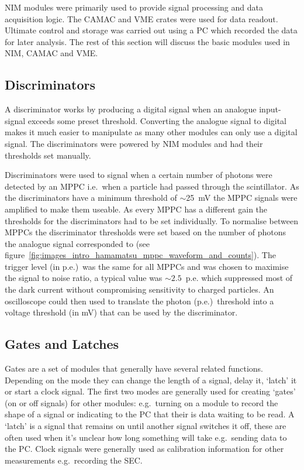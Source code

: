 NIM modules were primarily used to provide signal processing and data acquisition logic. The CAMAC and VME crates were used for data readout. Ultimate control and storage was carried out using a PC which recorded the data for later analysis. The rest of this section will discuss the basic modules used in NIM, CAMAC and VME.
\subsection{Discriminators} %
\label{ssub:discriminators}
A discriminator works by producing a digital signal when an analogue input-signal exceeds some preset threshold. Converting the analogue signal to digital makes it much easier to manipulate as many other modules can only use a digital signal. The discriminators were powered by NIM modules and had their thresholds set manually.

Discriminators were used to signal when a certain number of photons were detected by an MPPC i.e.\ when a particle had passed through the scintillator. As the discriminators have a minimum threshold of \(\sim\)25~mV the MPPC signals were amplified to make them useable. As every MPPC has a different gain the thresholds for the discriminators had to be set individually. To normalise between MPPCs the discriminator thresholds were set based on the number of photons the analogue signal corresponded to (see figure~\ref{fig:images_intro_hamamatsu_mppc_waveform_and_counts}). The trigger level (in p.e.)\ was the same for all MPPCs and was chosen to maximise the signal to noise ratio, a typical value was \(\sim2.5\)~p.e. which suppressed most of the dark current without compromising sensitivity to charged particles. An oscilloscope could then used to translate the photon (p.e.)\ threshold into a voltage threshold (in mV) that can be used by the discriminator.


\subsection{Gates and Latches} %
\label{ssub:gates}
Gates are a set of modules that generally have several related functions. Depending on the mode they can change the length of a signal, delay it, `latch' it or start a clock signal. The first two modes are generally used for creating `gates' (on or off signals) for other modules: e.g.\ turning on a module to record the shape of a signal or indicating to the PC that their is data waiting to be read. A `latch' is a signal that remains on until another signal switches it off, these are often used when it's unclear how long something will take e.g.\ sending data to the PC. Clock signals were generally used as calibration information for other measurements e.g.\ recording the SEC.

